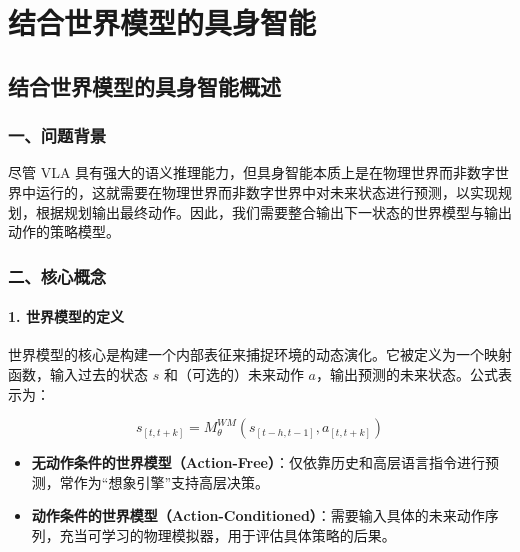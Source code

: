 \hypertarget{ux7ed3ux5408ux4e16ux754cux6a21ux578bux7684ux5177ux8eabux667aux80fd}{%
\chapter{结合世界模型的具身智能}\label{ux7ed3ux5408ux4e16ux754cux6a21ux578bux7684ux5177ux8eabux667aux80fd}}

\hypertarget{ux7ed3ux5408ux4e16ux754cux6a21ux578bux7684ux5177ux8eabux667aux80fdux6982ux8ff0}{%
\section{结合世界模型的具身智能概述}\label{ux7ed3ux5408ux4e16ux754cux6a21ux578bux7684ux5177ux8eabux667aux80fdux6982ux8ff0}}

\hypertarget{ux4e00ux95eeux9898ux80ccux666f-17}{%
\subsection{一、问题背景}\label{ux4e00ux95eeux9898ux80ccux666f-17}}

尽管 VLA 具有强大的语义推理能力，但具身智能本质上是在物理世界而非数字世界中运行的，这就需要在物理世界而非数字世界中对未来状态进行预测，以实现规划，根据规划输出最终动作。因此，我们需要整合输出下一状态的世界模型与输出动作的策略模型。

\hypertarget{ux4e8cux6838ux5fc3ux6982ux5ff5-1}{%
\subsection{二、核心概念}\label{ux4e8cux6838ux5fc3ux6982ux5ff5-1}}

\hypertarget{ux4e16ux754cux6a21ux578bux7684ux5b9aux4e49}{%
\subsubsection{1. 世界模型的定义}\label{ux4e16ux754cux6a21ux578bux7684ux5b9aux4e49}}

世界模型的核心是构建一个内部表征来捕捉环境的动态演化。它被定义为一个映射函数，输入过去的状态 \(s\) 和（可选的）未来动作 \(a\)，输出预测的未来状态。公式表示为：

\[
s_{[t,t+k]} = M_{\theta}^{WM}\left(s_{[t-h,t-1]}, a_{[t,t+k]}\right)
\]

\begin{itemize}
\tightlist
\item
  \textbf{无动作条件的世界模型（Action-Free）}：仅依靠历史和高层语言指令进行预测，常作为``想象引擎''支持高层决策。
\item
  \textbf{动作条件的世界模型（Action-Conditioned）}：需要输入具体的未来动作序列，充当可学习的物理模拟器，用于评估具体策略的后果。
\end{itemize}

